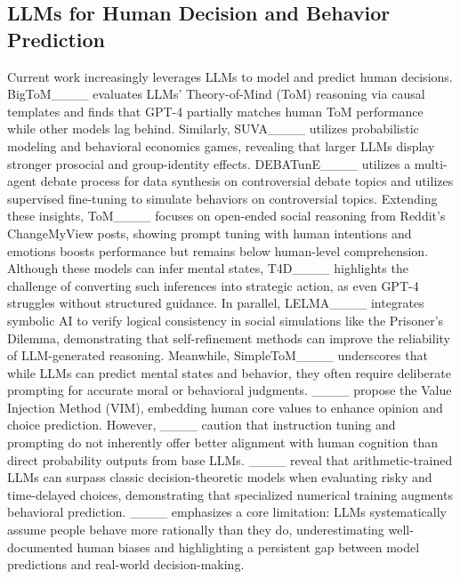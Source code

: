 \subsection{LLMs for Human Decision and Behavior Prediction}
\vspace{-0.2cm}
Current work increasingly leverages LLMs to model and predict human decisions. 
BigToM____ evaluates LLMs’ Theory-of-Mind (ToM) reasoning via causal templates and finds that GPT-4 partially matches human ToM performance while other models lag behind. 
Similarly, SUVA____ utilizes probabilistic modeling and behavioral economics games, revealing that larger LLMs display stronger prosocial and group-identity effects. 
DEBATunE____ utilizes a multi-agent debate process for data synthesis on controversial debate topics and utilizes supervised fine-tuning to simulate behaviors on controversial topics. 
Extending these insights, ToM____ focuses on open-ended social reasoning from Reddit’s ChangeMyView posts, showing prompt tuning with human intentions and emotions boosts performance but remains below human-level comprehension. 
Although these models can infer mental states, T4D____ highlights the challenge of converting such inferences into strategic action, as even GPT-4 struggles without structured guidance. 
In parallel, LELMA____ integrates symbolic AI to verify logical consistency in social simulations like the Prisoner’s Dilemma, demonstrating that self-refinement methods can improve the reliability of LLM-generated reasoning. 
Meanwhile, SimpleToM____ underscores that while LLMs can predict mental states and behavior, they often require deliberate prompting for accurate moral or behavioral judgments. ____ propose the Value Injection Method (VIM), embedding human core values to enhance opinion and choice prediction. 
However, ____ caution that instruction tuning and prompting do not inherently offer better alignment with human cognition than direct probability outputs from base LLMs. %
____ reveal that arithmetic-trained LLMs can surpass classic decision-theoretic models when evaluating risky and time-delayed choices, demonstrating that specialized numerical training augments behavioral prediction. 
____ emphasizes a core limitation: LLMs systematically assume people behave more rationally than they do, underestimating well-documented human biases and highlighting a persistent gap between model predictions and real-world decision-making.

 

\vspace{-0.2cm}